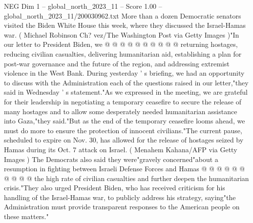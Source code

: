 \begin{textsample}{NEG Dim 1 – global\_north\_2023\_11 – Score 1.00 – global\_north\_2023\_11/200030962.txt}
More than a dozen Democratic senators visited the Biden White House this week, where they discussed the Israel-Hamas war. ( Michael Robinson Ch? vez/The Washington Post via Getty Images )"In our letter to President Biden, we @ @ @ @ @ @ @ @ @ @ returning hostages, reducing civilian casualties, delivering humanitarian aid, establishing a plan for post-war governance and the future of the region, and addressing extremist violence in the West Bank.
During yesterday ' s briefing, we had an opportunity to discuss with the Administration each of the questions raised in our letter,"they said in Wednesday ' s statement."As we expressed in the meeting, we are grateful for their leadership in negotiating a temporary ceasefire to secure the release of many hostages and to allow some desperately needed humanitarian assistance into Gaza,"they said."But as the end of the temporary ceasefire looms ahead, we must do more to ensure the protection of innocent civilians."The current pause, scheduled to expire on Nov. 30, has allowed for the release of hostages seized by Hamas during its Oct. 7 attack on Israel. ( Menahem Kahana/AFP via Getty Images ) The Democrats also said they were"gravely concerned"about a resumption in fighting between Israeli Defense Forces and Hamas @ @ @ @ @ @ @ @ @ @ the high rate of civilian casualties and further deepen the humanitarian crisis."They also urged President Biden, who has received criticism for his handling of the Israel-Hamas war, to publicly address his strategy, saying"the Administration must provide transparent responses to the American people on these matters."

\end{textsample}
